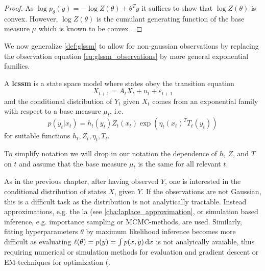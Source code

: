\begin{proof}
    As $\log p_{\theta}(y) = - \log Z(\theta) + \theta^{T} y$ it suffices to show that $\log Z(\theta)$ is convex. However, $\log Z(\theta)$ is the cumulant generating function of the base measure $\mu$ which is known to be convex .
\end{proof}

We now generalize \cref{def:glssm} to allow for non-gaussian observations by replacing the observation equation \cref{eq:glssm_observations} by more general exponential families.

\begin{definition}
    A \textbf{\gls{lcssm}} is a state space model where states obey the transition equation 
    $$
    X_{t + 1} = A_{t}X_{t} + u_{t} + \varepsilon_{t + 1}
    $$
    and the conditional distribution of $Y_{t}$ given $X_{t}$ comes from an exponential family with respect to a base measure $\mu_{t}$, i.e.
    $$
    p (y_{t}|x_{t}) = h_{t}(y_{t}) Z_{t}(x_{t}) \exp \left( \eta_{t}(x_{t})^{T} T_{t}(y_{t}) \right)
    $$
    for suitable functions $h_{t}, Z_{t}, \eta_{t}, T_{t}$. 

\end{definition}

\begin{remark}
    To simplify notation we will drop in our notation the dependence of $h$, $Z$, and $T$ on $t$ and assume that the base measure $\mu_t$ is the same for all relevant $t$.
\end{remark}



As in the previous chapter, after having observed $Y$, one is interested in the conditional distribution of states $X$, given $Y$. If the observations are not Gaussian, this is a difficult task as the distribution is not analytically tractable. Instead approximations, e.g. the \gls{la} (see \cref{cha:laplace_approximation}, or simulation based inference, e.g. importance sampling or MCMC-methods, are used. Similarly, fitting hyperparameters $\theta$ by maximum likelihood inference becomes more difficult as evaluating $\ell(\theta) = p(y) = \int p(x,y) \,\mathrm d x$ is not analyically avaiable, thus requiring numerical or simulation methods for evaluation and  gradient descent or EM-techniques for optimization (.

